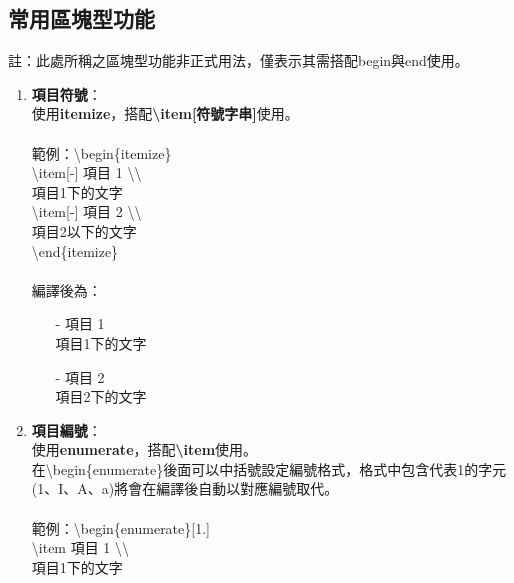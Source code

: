 \documentclass[12pt]{article}
\begin{document}
\begin{CJK*}{UTF8}{bsmi}
		\subsection{常用區塊型功能}
			註：此處所稱之區塊型功能非正式用法，僅表示其需搭配begin與end使用。
			\begin{enumerate}[1.]
				\item \textbf{項目符號}： \\
					使用\textbf{itemize}，搭配\textbf{\textbackslash item[符號字串]}使用。 \\ \\
					範例：\textbackslash begin\{itemize\} \\
					\hspace*{5pc}\textbackslash item[-] 項目 1 \textbackslash \textbackslash \\
					\hspace*{7pc} 項目1下的文字 \\
					\hspace*{5pc}\textbackslash item[-] 項目 2 \textbackslash \textbackslash \\
					\hspace*{7pc} 項目2以下的文字 \\
					\hspace*{3pc}\textbackslash end\{itemize\} \\ \\
					編譯後為：
					\begin{itemize}
						\item[-] 項目 1 \\
							項目1下的文字
						\item[-] 項目 2 \\
							項目2下的文字
					\end{itemize}
				\item \textbf{項目編號}： \\
					使用\textbf{enumerate}，搭配\textbf{\textbackslash item}使用。 \\
					在\textbackslash begin\{enumerate\}後面可以中括號設定編號格式，格式中包含代表1的字元(1、I、A、a)將會在編譯後自動以對應編號取代。 \\ \\
					範例：\textbackslash begin\{enumerate\}[1.] \\
					\hspace*{5pc}\textbackslash item 項目 1 \textbackslash \textbackslash \\
					\hspace*{7pc} 項目1下的文字 \\

\end{enumerate}
\end{CJK*}
\end{document}
